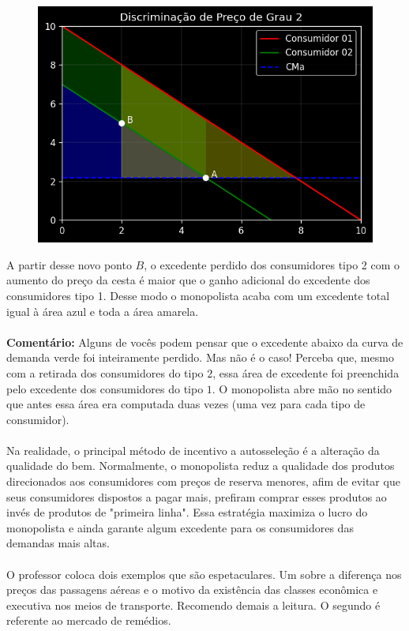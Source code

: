 \documentclass[a4paper,11pt,oneside]{book}
\theoremstyle{definition}
\theoremstyle{break}
\begin{document}
\begin{figure}[H]
\centering
\includegraphics[scale=0.8]{cap26_3-discriminacao_grau2_3.png}
\end{figure}

A partir desse novo ponto $B$, o excedente perdido dos consumidores tipo 2 com o aumento do preço da cesta é maior que o ganho adicional do excedente dos consumidores tipo 1. Desse modo o monopolista acaba com um excedente total igual à área azul e toda a área amarela.
\\
\\
\textbf{Comentário:} Alguns de vocês podem pensar que o excedente abaixo da curva de demanda verde foi inteiramente perdido. Mas não é o caso! Perceba que, mesmo com a retirada dos consumidores do tipo $2$, essa área de excedente foi preenchida pelo excedente dos consumidores do tipo $1$. O monopolista abre mão no sentido que antes essa área era computada duas vezes (uma vez para cada tipo de consumidor).
\\
\\
Na realidade, o principal método de incentivo a autosseleção é a alteração da qualidade do bem. Normalmente, o monopolista reduz a qualidade dos produtos direcionados aos consumidores com preços de reserva menores, afim de evitar que seus consumidores dispostos a pagar mais, prefiram comprar esses produtos ao invés de produtos de "primeira linha". Essa estratégia maximiza o lucro do monopolista e ainda garante algum excedente para os consumidores das demandas mais altas.
\\
\\
O professor coloca dois exemplos que são espetaculares. Um sobre a diferença nos preços das passagens aéreas e o motivo da existência das classes econômica e executiva nos meios de transporte. Recomendo demais a leitura. O segundo é referente ao mercado de remédios.
\end{document}
